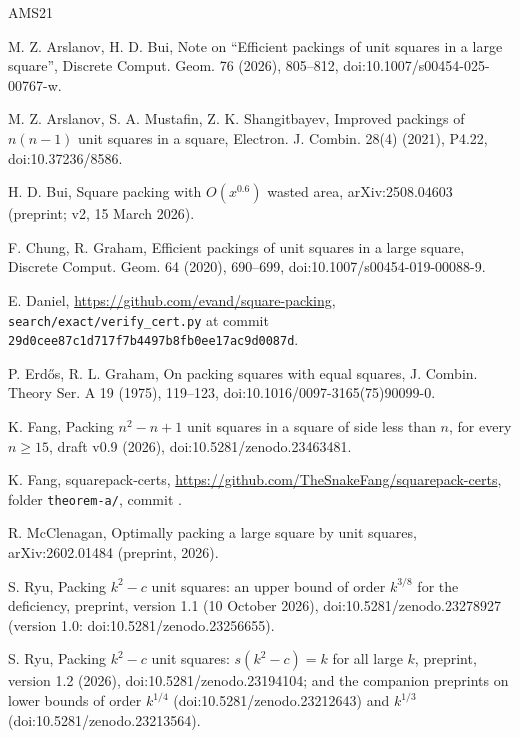 \documentclass[11pt,letterpaper]{amsart}
\theoremstyle{plain}
\theoremstyle{remark}
\begin{document}
\begin{thebibliography}{AMS21}

 M. Z. Arslanov, H. D. Bui, Note on ``Efficient packings of unit squares in a large square'', Discrete Comput. Geom. 76 (2026), 805--812, doi:10.1007/s00454-025-00767-w.

 M. Z. Arslanov, S. A. Mustafin, Z. K. Shangitbayev, Improved packings of $n(n-1)$ unit squares in a square, Electron. J. Combin. 28(4) (2021), P4.22, doi:10.37236/8586.

 H. D. Bui, Square packing with $O(x^{0.6})$ wasted area, arXiv:2508.04603 (preprint; v2, 15 March 2026).

 F. Chung, R. Graham, Efficient packings of unit squares in a large square, Discrete Comput. Geom. 64 (2020), 690--699, doi:10.1007/s00454-019-00088-9.

 E. Daniel, \url{https://github.com/evand/square-packing}, \texttt{search/exact/verify\_cert.py} at commit \texttt{29d0cee87c1d717f7b4497b8fb0ee17ac9d0087d}.

 P. Erd\H{o}s, R. L. Graham, On packing squares with equal squares, J. Combin. Theory Ser. A 19 (1975), 119--123, doi:10.1016/0097-3165(75)90099-0.

 K. Fang, Packing $n^2-n+1$ unit squares in a square of side less than $n$, for every $n\ge15$, draft v0.9 (2026), doi:10.5281/zenodo.23463481.

 K. Fang, squarepack-certs, \url{https://github.com/TheSnakeFang/squarepack-certs}, folder \texttt{theorem-a/}, commit .

 R. McClenagan, Optimally packing a large square by unit squares, arXiv:2602.01484 (preprint, 2026).

 S. Ryu, Packing $k^2-c$ unit squares: an upper bound of order $k^{3/8}$ for the deficiency, preprint, version 1.1 (10 October 2026), doi:10.5281/zenodo.23278927 (version 1.0: doi:10.5281/zenodo.23256655).

 S. Ryu, Packing $k^2-c$ unit squares: $s(k^2-c)=k$ for all large $k$, preprint, version 1.2 (2026), doi:10.5281/zenodo.23194104; and the companion preprints on lower bounds of order $k^{1/4}$ (doi:10.5281/zenodo.23212643) and $k^{1/3}$ (doi:10.5281/zenodo.23213564).

\end{thebibliography}
\end{document}
